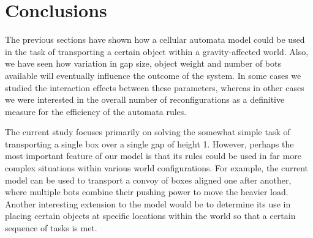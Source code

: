 \section{Conclusions}
\label{sec:concl}
The previous sections have shown how a cellular automata model could be used in the task of transporting a certain object within a gravity-affected world. Also, we have seen how variation in gap size, object weight and number of bots available will eventually influence the outcome of the system. In some cases we studied the interaction effects between these parameters, whereas in other cases we were interested in the overall number of reconfigurations as a definitive measure for the efficiency of the automata rules.

The current study focuses primarily on solving the somewhat simple task of transporting a single box over a single gap of height 1. However, perhaps the most important feature of our model is that its rules could be used in far more complex situations within various world configurations. For example, the current model can be used to transport a convoy of boxes aligned one after another, where multiple bots combine their pushing power to move the heavier load. Another interesting extension to the model would be to determine its use in placing certain objects at specific locations within the world so that a certain sequence of tasks is met. 
